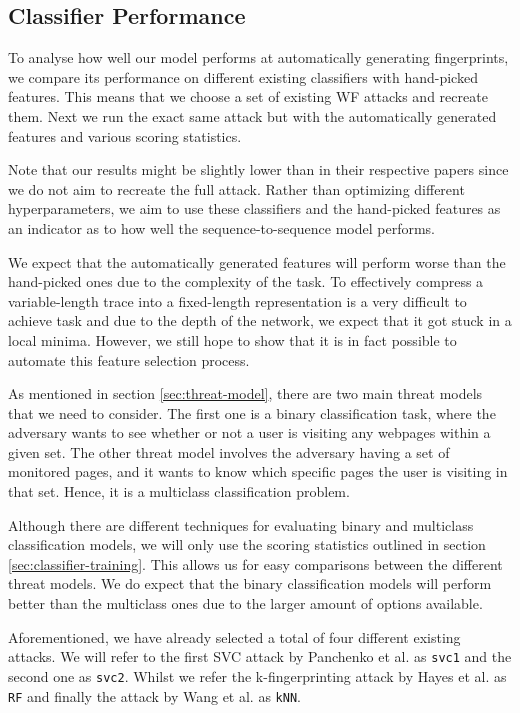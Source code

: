 
\subsection{Classifier Performance}

To analyse how well our model performs at automatically generating fingerprints, we compare its performance on different existing classifiers with hand-picked features.
This means that we choose a set of existing WF attacks and recreate them.
Next we run the exact same attack but with the automatically generated features and various scoring statistics.

Note that our results might be slightly lower than in their respective papers since we do not aim to recreate the full attack.
Rather than optimizing different hyperparameters, we aim to use these classifiers and the hand-picked features as an indicator as to how well the sequence-to-sequence model performs.

We expect that the automatically generated features will perform worse than the hand-picked ones due to the complexity of the task.
To effectively compress a variable-length trace into a fixed-length representation is a very difficult to achieve task and due to the depth of the network, we expect that it got stuck in a local minima.
However, we still hope to show that it is in fact possible to automate this feature selection process.

As mentioned in section \ref{sec:threat-model}, there are two main threat models that we need to consider.
The first one is a binary classification task, where the adversary wants to see whether or not a user is visiting any webpages within a given set.
The other threat model involves the adversary having a set of monitored pages, and it wants to know which specific pages the user is visiting in that set.
Hence, it is a multiclass classification problem.

Although there are different techniques for evaluating binary and multiclass classification models, we will only use the scoring statistics outlined in section \ref{sec:classifier-training}.
This allows us for easy comparisons between the different threat models.
We do expect that the binary classification models will perform better than the multiclass ones due to the larger amount of options available.

Aforementioned, we have already selected a total of four different existing attacks.
We will refer to the first SVC attack by Panchenko et al. \cite{panchenko1} as \texttt{svc1} and the second one \cite{panchenko2} as \texttt{svc2}.
Whilst we refer the k-fingerprinting attack by Hayes et al. \cite{kfingerprinting} as \texttt{RF} and finally the attack by Wang et al. \cite{wang_cai_johnson_nithyanand_goldberg_2014} as \texttt{kNN}.

